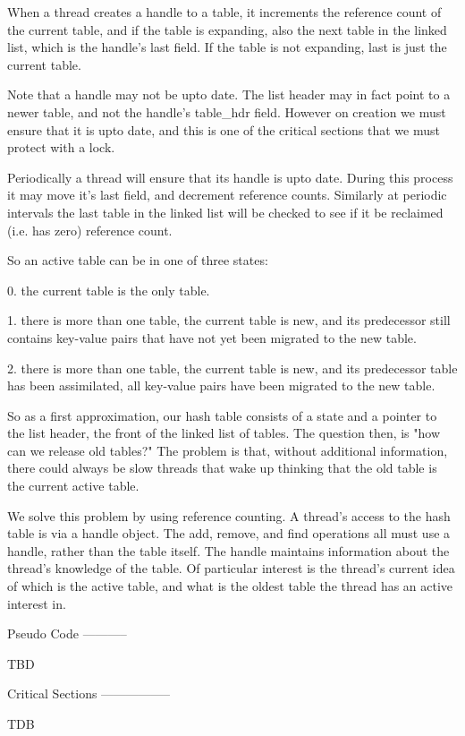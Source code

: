 When a thread creates a handle to a table, it increments the reference
count of the current table, and if the table is expanding, also the
next table in the linked list, which is the handle's last field.  If
the table is not expanding, last is just the current table.

Note that a handle may not be upto date. The list
header may in fact point to a newer table, and not the handle's table_hdr
field. However on creation we must ensure that it is upto date, and
this is one of the critical sections that we must protect with a lock.

Periodically a thread will ensure that its handle is upto date. During this process
it may move it's last field, and decrement reference counts. Similarly
at periodic intervals the last table in the linked list will be checked to see
if it be reclaimed (i.e. has zero) reference count.



So an active table can be in one of three states:

0. the current table is the only table.

1. there is more than one table, the current table is new, and its
predecessor still contains key-value pairs that have not yet been
migrated to the new table.

2. there is more than one table, the current table is new, and its
predecessor table has been assimilated, all key-value pairs have been
migrated to the new table.


So as a first approximation, our hash table consists of a state and a
pointer to the list header, the front of the linked list of tables.
The question then, is "how can we release old tables?" The problem is
that, without additional information, there could always be slow
threads that wake up thinking that the old table is the current active
table.

We solve this problem by using reference counting. A thread's access
to the hash table is via a handle object. The add, remove, and find
operations all must use a handle, rather than the table itself.  The
handle maintains information about the thread's knowledge of the
table. Of particular interest is the thread's current idea of which
is the active table, and what is the oldest table the thread has
an active interest in.



Pseudo Code
-----------

TBD


Critical Sections
-----------------

TDB
